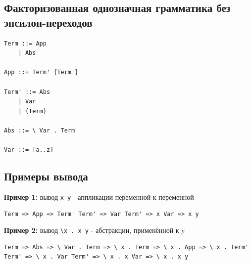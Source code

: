\documentclass[11pt]{article}
\begin{document}
\subsection*{Факторизованная однозначная грамматика без эпсилон-переходов}

\begin{verbatim}
Term ::= App
    | Abs

App ::= Term' {Term'}

Term' ::= Abs
    | Var
    | (Term)

Abs ::= \ Var . Term

Var ::= [a..z]
\end{verbatim}

\subsection*{Примеры вывода}

\textbf{Пример 1:} вывод \texttt{x y} - аппликации переменной к переменной

\begin{verbatim}
Term => App => Term' Term' => Var Term' => x Var => x y
\end{verbatim}

\textbf{Пример 2:} вывод \texttt{\textbackslash x . x y} - абстракции, применённой к y

\begin{verbatim}
Term => Abs => \ Var . Term => \ x . Term => \ x . App => \ x . Term' Term' => \ x . Var Term' => \ x . x Var => \ x . x y
\end{verbatim}
\end{document}
